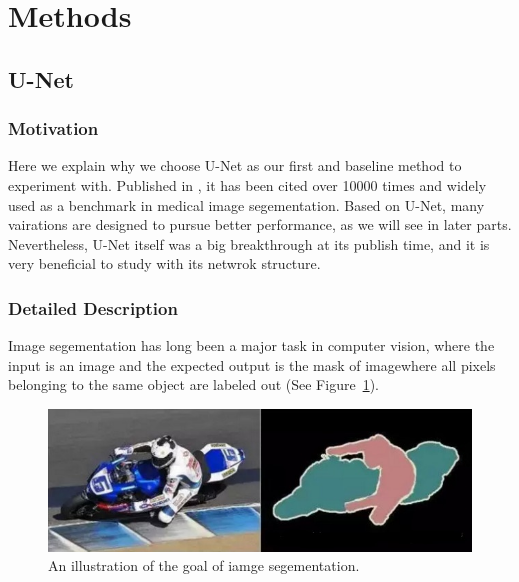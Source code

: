 \section{Methods}
\subsection{U-Net}
\subsubsection{Motivation}
Here we explain why we choose U-Net as our first and baseline method to experiment with. Published in \cite{unet}, it has been cited over 10000 times and widely used as a benchmark in medical image segementation. Based on U-Net, many vairations are designed to pursue better performance, as we will see in later parts. Nevertheless, U-Net itself was a big breakthrough at its publish time, and it is very beneficial to study with its netwrok structure.

\subsubsection{Detailed Description}
Image segementation has long been a major task in computer vision, where the input is an image and the expected output is the mask of image\textemdash where all pixels belonging to the same object are labeled out (See Figure~\ref{fig:sege}). 
\begin{figure}[!htpb]
    \centering
    \includegraphics[scale=0.3]{figuras/segementation.jpg}
    \caption{An illustration of the goal of iamge segementation.}
    \label{fig:sege}
\end{figure}


